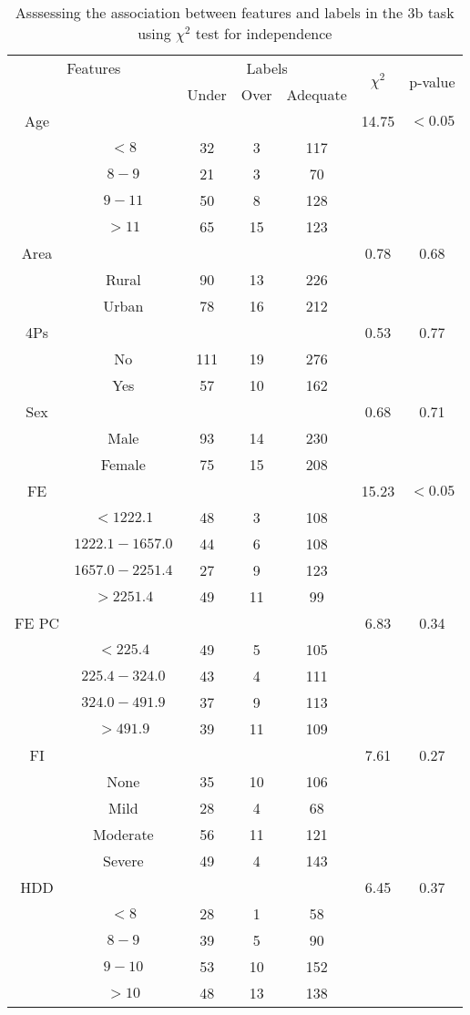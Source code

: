 \begin{table}[!htb]
\centering
\caption{Asssessing the association between features and labels in the 3b task using $\chi^2$ test for independence}
\label{tab:chitest_3b}
\begin{tabular}{c c | c c c| c | c}
\hline
\multicolumn{2}{c|}{Features}& \multicolumn{3}{c|}{Labels}& \multirow{2}{*}{$\chi^2$} & \multirow{2}{*}{p-value}\\ 
& & Under & Over & Adequate & & \\ 
\hline
Age &  &  &  & & 14.75 & $< 0.05$ \\ 
& $< 8$ & 32 & 3 & 117& & \\ 
& $8-9$ & 21 & 3 & 70& & \\ 
& $9-11$ & 50 & 8 & 128& & \\ 
& $> 11$ & 65 & 15 & 123& & \\ 
\hline 
Area &  &  &  & & 0.78 & 0.68 \\ 
& Rural & 90 & 13 & 226& & \\ 
& Urban & 78 & 16 & 212& & \\ 
\hline 
4Ps &  &  &  & & 0.53 & 0.77 \\ 
& No & 111 & 19 & 276& & \\ 
& Yes & 57 & 10 & 162& & \\ 
\hline 
Sex &  &  &  & & 0.68 & 0.71 \\ 
& Male & 93 & 14 & 230& & \\ 
& Female & 75 & 15 & 208& & \\ 
\hline 
FE &  &  &  & & 15.23 & $< 0.05$ \\ 
& $< 1222.1$ & 48 & 3 & 108& & \\ 
& $1222.1-1657.0$ & 44 & 6 & 108& & \\ 
& $1657.0-2251.4$ & 27 & 9 & 123& & \\ 
& $> 2251.4$ & 49 & 11 & 99& & \\ 
\hline 
FE PC &  &  &  & & 6.83 & 0.34 \\ 
& $< 225.4$ & 49 & 5 & 105& & \\ 
& $225.4-324.0$ & 43 & 4 & 111& & \\ 
& $324.0-491.9$ & 37 & 9 & 113& & \\ 
& $> 491.9$ & 39 & 11 & 109& & \\ 
\hline 
FI &  &  &  & & 7.61 & 0.27 \\ 
& None & 35 & 10 & 106& & \\ 
& Mild & 28 & 4 & 68& & \\ 
& Moderate & 56 & 11 & 121& & \\ 
& Severe & 49 & 4 & 143& & \\ 
\hline 
HDD &  &  &  & & 6.45 & 0.37 \\ 
& $< 8$ & 28 & 1 & 58& & \\ 
& $8-9$ & 39 & 5 & 90& & \\ 
& $9-10$ & 53 & 10 & 152& & \\ 
& $> 10$ & 48 & 13 & 138& & \\ 
\hline 
\end{tabular}
\end{table}
